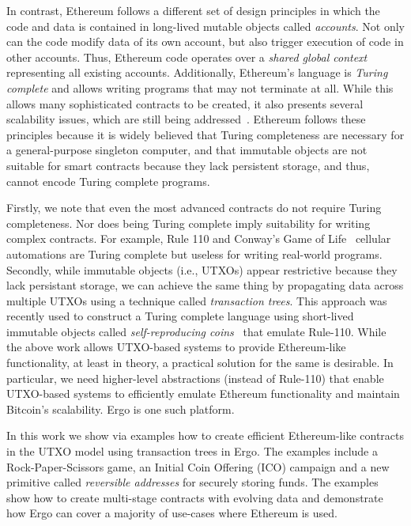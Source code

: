 \documentclass[runningheads]{llncs}
\begin{document}
In contrast, Ethereum follows a different set of design principles in which the code and data is contained in long-lived mutable objects called {\em accounts}. Not only can the code modify data of its own account, but also trigger execution of code in other accounts. Thus, Ethereum code operates over a {\em shared global context} representing all existing accounts. Additionally, Ethereum's language is {\em Turing complete} and allows writing programs that may not terminate at all. While this allows many sophisticated contracts to be created, it also presents several scalability issues, which are still being addressed~\cite{Luu:2016:MSC:2976749.2978309}. Ethereum follows these principles because it is widely believed that Turing completeness are necessary for a general-purpose singleton computer, and that immutable objects are not suitable for smart contracts because they lack persistent storage, and thus, cannot encode Turing complete programs. 

Firstly, we note that even the most advanced contracts do not require Turing completeness. Nor does being Turing complete imply suitability for writing complex contracts. For example, Rule 110 \cite{Cook_2009,neary2006p} and Conway's Game of Life~\cite{rendell2014turing} cellular automations are Turing complete but useless for writing real-world programs. 
Secondly, while immutable objects (i.e., UTXOs) appear restrictive because they lack persistant storage, we can achieve the same thing by propagating data across multiple UTXOs using a technique called {\em transaction trees}. This approach was recently used to construct a Turing complete language using short-lived immutable objects called {\em self-reproducing coins}~\cite{CKM18a} that emulate Rule-110. 
While the above work allows UTXO-based systems to provide Ethereum-like functionality, at least in theory, a practical solution for the same is desirable. In particular, we need higher-level abstractions (instead of Rule-110) that enable UTXO-based systems to efficiently emulate Ethereum functionality and maintain Bitcoin's scalability. Ergo is one such platform.

In this work we show via examples how to create efficient Ethereum-like contracts in the UTXO model using transaction trees in Ergo. 
The examples include a Rock-Paper-Scissors game, an Initial Coin Offering (ICO) campaign and a new primitive called {\em reversible addresses} for securely storing funds. The examples show how to create multi-stage contracts with evolving data and demonstrate how Ergo can cover a majority of use-cases where Ethereum is used.  
\end{document}
